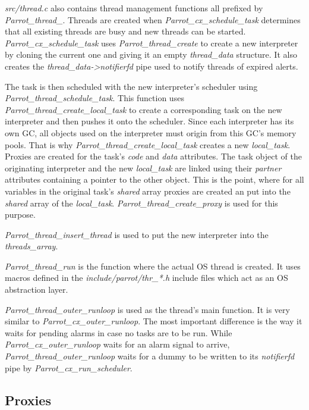 \documentclass[bachelor,english]{hgbthesis}
\begin{document}
\textit{src/thread.c} also contains thread management functions all prefixed by \textit{Parrot\_thread\_}. Threads are created when \textit{Parrot\_cx\_schedule\_task} determines that all existing threads are busy and new threads can be started. \textit{Parrot\_cx\_schedule\_task} uses \textit{Parrot\_thread\_create} to create a new interpreter by cloning the current one and giving it an empty \textit{thread\_data} structure. It also creates the \textit{thread\_data->notifierfd} pipe used to notify threads of expired alerts.

The task is then scheduled with the new interpreter's scheduler using \textit{Parrot\_thread\_schedule\_task}. This function uses \textit{Parrot\_thread\_create\_local\_task} to create a corresponding task on the new interpreter and then pushes it onto the scheduler. Since each interpreter has its own GC, all objects used on the interpreter must origin from this GC's memory pools. That is why \textit{Parrot\_thread\_create\_local\_task} creates a new \textit{local\_task}. Proxies are created for the task's \textit{code} and \textit{data} attributes. The task object of the originating interpreter and the new \textit{local\_task} are linked using their \textit{partner} attributes containing a pointer to the other object. This is the point, where for all variables in the original task's \textit{shared} array proxies are created an put into the \textit{shared} array of the \textit{local\_task}. \textit{Parrot\_thread\_create\_proxy} is used for this purpose.

\textit{Parrot\_thread\_insert\_thread} is used to put the new interpreter into the \textit{threads\_array}.

\textit{Parrot\_thread\_run} is the function where the actual OS thread is created. It uses macros defined in the \textit{include/parrot/thr\_*.h} include files which act as an OS abstraction layer.

\textit{Parrot\_thread\_outer\_runloop} is used as the thread's main function. It is very similar to \textit{Parrot\_cx\_outer\_runloop}. The most important difference is the way it waits for pending alarms in case no tasks are to be run. While \textit{Parrot\_cx\_outer\_runloop} waits for an alarm signal to arrive, \textit{Parrot\_thread\_outer\_runloop} waits for a dummy to be written to its \textit{notifierfd} pipe by \textit{Parrot\_cx\_run\_scheduler}.

\subsection{Proxies}
\end{document}
